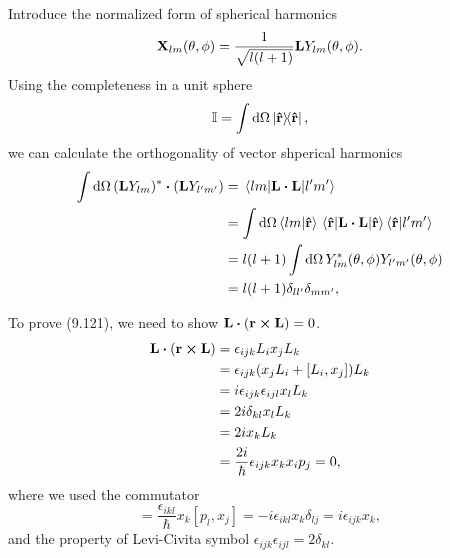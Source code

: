 \documentclass[10pt]{article}
\begin{document}
Introduce the normalized form of spherical harmonics
\begin{equation}
	\vb{X}_{lm}(\theta, \phi) = \frac{1}{\sqrt{l(l+1)}} \vb{L} Y_{lm}(\theta, \phi).
\end{equation}
Using the completeness in a unit sphere
\begin{equation}
	\mathbb{I} = \int \dd{\Omega} \dyad{\vu{r}},
\end{equation}
we can calculate the orthogonality of vector shperical harmonics
\begin{align*}
	\int \dd{\Omega} (\vb{L}Y_{lm})^* \vdot (\vb{L}Y_{l'm'})
	&= \mel{lm}{\vb{L}\vdot\vb{L}}{l'm'} \\
	&= \int \dd{\Omega} \braket{lm}{\vu{r}} \ev{\vb{L}\vdot\vb{L}}{\vu{r}} \braket{\vu{r}}{l'm'} \\
	&= l(l+1) \int \dd{\Omega} Y_{lm}^* (\theta, \phi) Y_{l'm'} (\theta, \phi) \\
	&= l(l+1) \delta_{l l'}\delta_{m m'},
\end{align*}

To prove (9.121), we need to show $\vb{L}\vdot(\vb{r} \cross \vb{L}) = 0$.
\begin{align*}
	\vb{L}\vdot(\vb{r} \cross \vb{L}) &= \epsilon_{ijk} L_i x_j L_k \\
	&= \epsilon_{ijk} (x_j L_i + [L_i, x_j]) L_k \\
	&= i \epsilon_{ijk} \epsilon_{ijl} x_l L_k \\
	&= 2i \delta_{kl} x_l L_k \\
	&= 2i x_k L_k \\
	&= \frac{2i}{\hbar} \epsilon_{ijk} x_k x_i p_j = 0,
\end{align*}
where we used the commutator
\begin{equation}
	[L_i, x_j] = \frac{\epsilon_{ikl}}{\hbar} x_k [p_l, x_j] = -i \epsilon_{ikl} x_k \delta_{lj} = i \epsilon_{ijk} x_k,
\end{equation}
and the property of Levi-Civita symbol $\epsilon_{ijk} \epsilon_{ijl} = 2 \delta_{kl}$.
\end{document}

